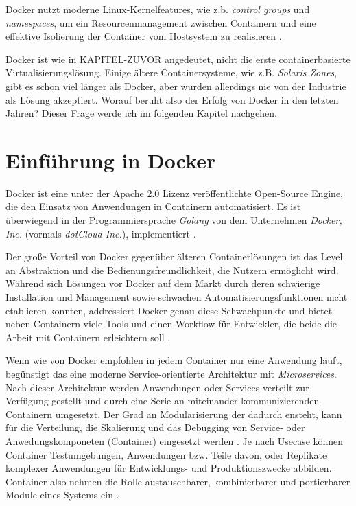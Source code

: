 \documentclass[11pt,a4paper,oneside]{report}
\begin{document}
      Docker nutzt moderne Linux-Kernelfeatures, wie z.b. \emph{control groups} und \emph{namespaces}, um ein Resourcenmanagement zwischen Containern und eine effektive Isolierung der Container vom Hostsystem zu realisieren \cite[S.7]{dockerBook}.

      Docker ist wie in KAPITEL-ZUVOR angedeutet, nicht die erste containerbasierte Virtualisierungslösung. Einige ältere Containersysteme, wie z.B. \emph{Solaris Zones}, gibt es schon viel länger als Docker, aber wurden allerdings nie von der Industrie als Lösung akzeptiert. Worauf beruht also der Erfolg von Docker in den letzten Jahren? Dieser Frage werde ich im folgenden Kapitel nachgehen.
  \section{Einführung in Docker}
  \label{dockerIntro}
    Docker ist eine unter der Apache 2.0 Lizenz veröffentlichte Open-Source Engine, die den Einsatz von Anwendungen in Containern automatisiert. Es ist überwiegend in der Programmiersprache \emph{Golang} von dem Unternehmen \emph{Docker, Inc.} (vormals \emph{dotCloud Inc.}), implementiert \cite{githubDocker}\cite[S.7]{dockerBook}.



    Der große Vorteil von Docker gegenüber älteren Containerlösungen ist das Level an Abstraktion und die Bedienungsfreundlichkeit, die Nutzern ermöglicht wird. Während sich Lösungen vor Docker auf dem Markt durch deren schwierige Installation und Management sowie schwachen Automatisierungsfunktionen nicht etablieren konnten, addressiert Docker genau diese Schwachpunkte \cite[S.7]{dockerBook} und bietet neben Containern viele Tools und einen Workflow für Entwickler, die beide die Arbeit mit Containern erleichtern soll \cite[S.1]{dockerIntroIEEE}.




    Wenn wie von Docker empfohlen in jedem Container nur eine Anwendung läuft, begünstigt das eine moderne Service-orientierte Architektur mit \emph{Microservices}. Nach dieser Architektur werden Anwendungen oder Services verteilt zur Verfügung gestellt und durch eine Serie an miteinander kommunizierenden Containern umgesetzt. Der Grad an Modularisierung der dadurch ensteht, kann für die Verteilung, die Skalierung und das Debugging von Service- oder Anwedungskomponeten (Container) eingesetzt werden \cite[S.9]{dockerBook}. Je nach Usecase können Container Testumgebungen, Anwendungen bzw. Teile davon, oder Replikate komplexer Anwendungen für Entwicklungs- und Produktionszwecke abbilden. Container also nehmen die Rolle austauschbarer, kombinierbarer und portierbarer Module eines Systems ein \cite[S.12]{dockerBook}.
\end{document}
